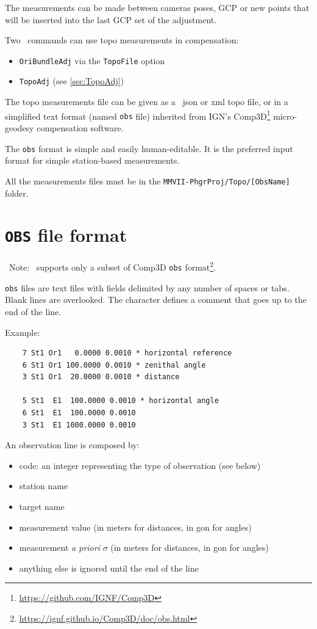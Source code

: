 The measurements can be made between cameras poses, GCP or new points that will be inserted into the last GCP set of the adjustment.

Two \CdPPP\ commands can use topo measurements in compensation:
\begin{itemize}
    \item {\tt OriBundleAdj} via the {\tt TopoFile} option
    \item {\tt TopoAdj} (see \ref{sec:TopoAdj})
\end{itemize}

The topo measurements file can be given as a \CdPPP\ json or xml topo file, or in a simplified text format (named {\tt obs} file) inherited from IGN's Comp3D\footnote{\url{https://github.com/IGNF/Comp3D}} micro-geodesy compensation software.

The {\tt obs} format is simple and easily human-editable. It is the preferred input format for simple station-based measurements.

All the measurements files must be in the {\tt MMVII-PhgrProj/Topo/[ObsName]} folder.

\section{\texttt{OBS} file format}
\label{sec:compObsFormat}

\faWarning\, Note: \CdPPP\ supports only a subset of Comp3D {\tt obs} format\footnote{\url{https://ignf.github.io/Comp3D/doc/obs.html}}.
\vspace{0.5cm}

{\tt obs} files are text files with fields delimited by any number of spaces or tabs. Blank lines are overlooked.
The {\tt *} character defines a comment that goes up to the end of the line.

Example:

\begin{verbatim}
    7 St1 Or1   0.0000 0.0010 * horizontal reference
    6 St1 Or1 100.0000 0.0010 * zenithal angle
    3 St1 Or1  20.0000 0.0010 * distance

    5 St1  E1  100.0000 0.0010 * horizontal angle
    6 St1  E1  100.0000 0.0010
    3 St1  E1 1000.0000 0.0010
\end{verbatim}

An observation line is composed by:

\begin{itemize}
    \item code: an integer representing the type of observation (see below)
    \item station name
    \item target name
    \item measurement value (in meters for distances, in gon for angles)
    \item measurement \textit{a priori} $\sigma$ (in meters for distances, in gon for angles)
    \item anything else is ignored until the end of the line
\end{itemize}

